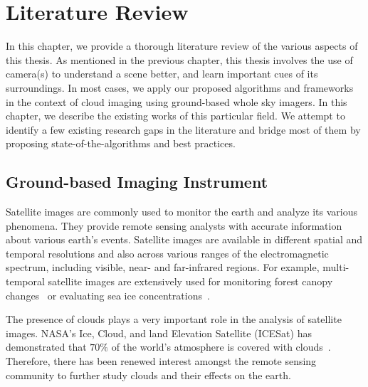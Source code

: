 \chapter{Literature Review}
\label{chap:litreview}

In this chapter, we provide a thorough literature review of the various aspects of this thesis. As mentioned in the previous chapter, this thesis involves the use of camera(s) to understand a scene better, and learn important cues of its surroundings. In most cases, we apply our proposed algorithms and frameworks in the context of cloud imaging using ground-based whole sky imagers. In this chapter, we describe the existing works of this particular field. We attempt to identify a few existing research gaps in the literature and bridge most of them by proposing state-of-the-algorithms and best practices. 

\section{Ground-based Imaging Instrument}
\label{sec:lit-wsi}
Satellite images are commonly used to monitor the earth and analyze its various phenomena. They provide remote sensing analysts with accurate information about various earth's events. Satellite images are available in different spatial and temporal resolutions and also across various ranges of the electromagnetic spectrum, including visible, near- and far-infrared regions. For example, multi-temporal satellite images are extensively used for monitoring forest canopy changes~\cite{forest} or evaluating sea ice concentrations~\cite{ice2008}. 

The presence of clouds plays a very important role in the analysis of satellite images. NASA's Ice, Cloud, and land Elevation Satellite (ICESat) has demonstrated that $70\%$ of the world's atmosphere is covered with clouds~\cite{NASA-cloud}. Therefore, there has been renewed interest amongst the remote sensing community to further study clouds and their effects on the earth. 

